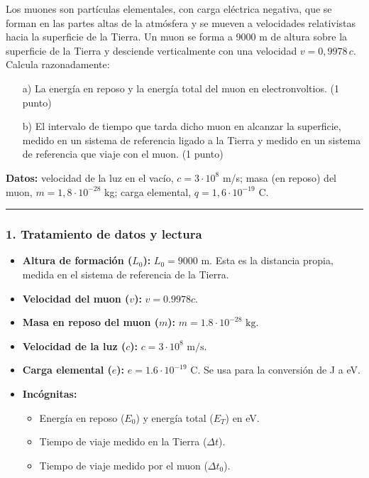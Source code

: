 \begin{cajaenunciado}
Los muones son partículas elementales, con carga eléctrica negativa, que se forman en las partes altas de la atmósfera y se mueven a velocidades relativistas hacia la superficie de la Tierra. Un muon se forma a 9000 m de altura sobre la superficie de la Tierra y desciende verticalmente con una velocidad $v=0,9978\,c$. Calcula razonadamente:
\begin{enumerate}
    \item[a)] La energía en reposo y la energía total del muon en electronvoltios. (1 punto)
    \item[b)] El intervalo de tiempo que tarda dicho muon en alcanzar la superficie, medido en un sistema de referencia ligado a la Tierra y medido en un sistema de referencia que viaje con el muon. (1 punto)
\end{enumerate}
\textbf{Datos:} velocidad de la luz en el vacío, $c=3\cdot10^{8}$ m/s; masa (en reposo) del muon, $m=1,8\cdot10^{-28}$ kg; carga elemental, $q=1,6\cdot10^{-19}$ C.
\end{cajaenunciado}
\hrule

\subsubsection*{1. Tratamiento de datos y lectura}
\begin{itemize}
    \item \textbf{Altura de formación ($L_0$):} $L_0 = 9000 \text{ m}$. Esta es la distancia propia, medida en el sistema de referencia de la Tierra.
    \item \textbf{Velocidad del muon ($v$):} $v = 0.9978c$.
    \item \textbf{Masa en reposo del muon ($m$):} $m = 1.8 \cdot 10^{-28} \text{ kg}$.
    \item \textbf{Velocidad de la luz ($c$):} $c = 3 \cdot 10^8 \text{ m/s}$.
    \item \textbf{Carga elemental ($e$):} $e = 1.6 \cdot 10^{-19} \text{ C}$. Se usa para la conversión de J a eV.
    \item \textbf{Incógnitas:}
    \begin{itemize}
        \item Energía en reposo ($E_0$) y energía total ($E_T$) en eV.
        \item Tiempo de viaje medido en la Tierra ($\Delta t$).
        \item Tiempo de viaje medido por el muon ($\Delta t_0$).
    \end{itemize}
\end{itemize}

